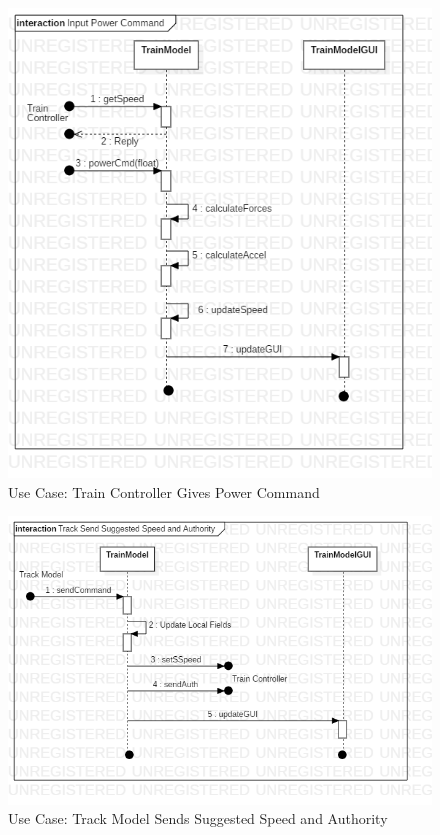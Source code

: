\documentclass{article}
\begin{document}
    \begin{figure}[H]
        \centering
        \includegraphics[width=\textwidth]{./TrainModel/PwrCmd.png}
        \caption{Use Case: Train Controller Gives Power Command}
        \label{fig:Train Model Power Command}
    \end{figure}
    \begin{figure}[H]
        \centering
        \includegraphics[width=\textwidth]{./TrainModel/SSpeedAuth.png}
        \caption{Use Case: Track Model Sends Suggested Speed and Authority}
        \label{fig:Train Model Speed Authority}
    \end{figure}
\end{document}
